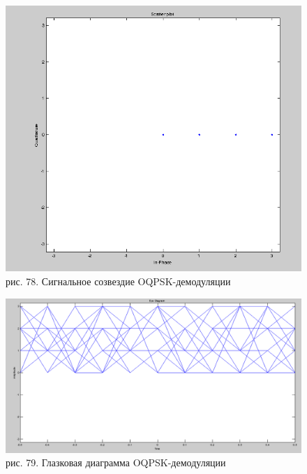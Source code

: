 \documentclass[10pt,a4paper]{report}
\begin{document}
\begin{figure}
\begin{center}
\includegraphics[width=150mm, scale = 0.9]{9_11}\newline
рис. 78. Сигнальное созвездие OQPSK-демодуляции\newline
\end{center}
\end{figure}
\begin{figure}
\begin{center}
\includegraphics[width=150mm, scale = 0.9]{9_12}\newline
рис. 79. Глазковая диаграмма OQPSK-демодуляции\newline
\end{center}
\end{figure}
\end{document}
